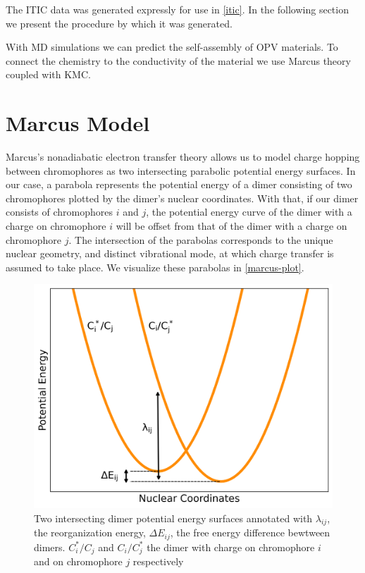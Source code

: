 The ITIC data was generated expressly for use in \autoref{itic}. In the following section we present the
procedure by which it was generated. 

With MD simulations we can predict the self-assembly of OPV materials. To connect the chemistry to the
conductivity of the material we use Marcus theory coupled with KMC.

\section{Marcus Model}
\label{marcusmodel}

Marcus's nonadiabatic electron transfer theory allows us to model charge hopping between chromophores as two
intersecting parabolic potential energy surfaces. 
In our case, a parabola represents the potential energy of a dimer consisting of two chromophores plotted by 
the dimer's nuclear coordinates. 
With that, if our dimer consists of chromophores $i$ and $j$, the potential energy curve of the dimer with a
charge on chromophore $i$ will be offset from that of the dimer with a charge on chromophore $j$. The
intersection of the parabolas corresponds to the unique nuclear geometry, and distinct vibrational mode, at
which charge transfer is assumed to take place. We visualize these parabolas in \autoref{marcus-plot}.
\begin{figure}
  \center
  \includegraphics[width=0.99\linewidth]{figures/marcus-plot.png} 
    \caption{Two intersecting dimer potential energy surfaces annotated with $\lambda_{ij}$, the
    reorganization energy, $\Delta E_{ij}$, the free energy difference bewtween dimers. $C_{i}^*/C_{j}$ 
    and $C_{i}/C_{j}^*$ the dimer with charge on chromophore $i$ and on chromophore $j$ respectively}
  \label{marcus-plot}
\end{figure}

